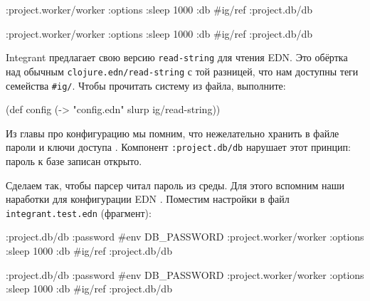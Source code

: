 \ifnarrow

\begin{english}
  \begin{clojure}
{:project.worker/worker
 {:options {:sleep 1000}
  :db #ig/ref :project.db/db}}
  \end{clojure}
\end{english}

\else

\begin{english}
  \begin{clojure}
{:project.worker/worker {:options {:sleep 1000}
                         :db #ig/ref :project.db/db}}
  \end{clojure}
\end{english}

\fi


\mnoindent
Integrant предлагает свою версию \verb|read-string| для чтения EDN. Это обёртка
над обычным \verb|clojure.edn/read-string| с той разницей, что нам доступны теги
семейства \verb|#ig/|. Чтобы прочитать систему из файла, выполните:

\begin{english}
  \begin{clojure}
(def config
  (-> "config.edn" slurp ig/read-string))
  \end{clojure}
\end{english}


Из главы про конфигурацию мы помним, что нежелательно хранить в файле пароли и
ключи доступа . Компонент \verb|:project.db/db| нарушает
этот принцип: пароль к базе записан открыто.

Сделаем так, чтобы парсер читал пароль из среды. Для этого вспомним наши
наработки для конфигурации EDN . Поместим настройки в файл
\texttt{integrant\-.test.edn} (фрагмент):

\ifnarrow

\begin{english}
  \begin{clojure}
{:project.db/db
 {:password #env DB_PASSWORD}
 :project.worker/worker
 {:options {:sleep 1000}
  :db #ig/ref :project.db/db}}
  \end{clojure}
\end{english}

\else

\begin{english}
  \begin{clojure}
{:project.db/db {:password #env DB_PASSWORD}
 :project.worker/worker {:options {:sleep 1000}
                         :db #ig/ref :project.db/db}}
  \end{clojure}
\end{english}

